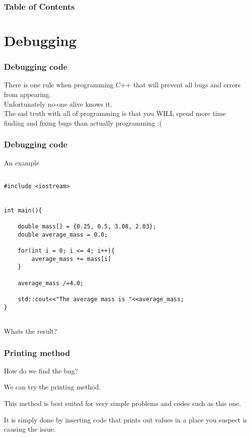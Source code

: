 \documentclass{beamer}
\subtitle{Extra Session}
\begin{document}
	
\frame{\titlepage}
	
\begin{frame}
	\frametitle{Table of Contents}
	\tableofcontents
\end{frame}
\section{Debugging}
\begin{frame}[fragile]
\frametitle{Debugging code}
There is one rule when programming C++ that will prevent all bugs and errors from appearing.\\
\pause
Unfortunately no-one alive knows it.\\
\pause The sad truth with all of programming is that you WILL spend more time finding and fixing bugs than actually programming \pause:(
\end{frame}

\begin{frame}[fragile]
	\frametitle{Debugging code}
	An example
	\pause
	\begin{lstlisting}
		
#include <iostream>
		
		
int main(){
		
	double mass[] = {0.25, 0.5, 3.08, 2.03};
	double average_mass = 0.0;
			
	for(int i = 0; i <= 4; i++){
		average_mass += mass[i]
	}
			
	average_mass /=4.0;
		
	std::cout<<"The average mass is "<<average_mass;
}
		
	\end{lstlisting}
	\pause
	Whats the result?
	
\end{frame}


\begin{frame}[fragile]
	\frametitle{Printing method}
	How do we find the bug?\pause
	
	We can try the printing method.\pause
	
	This method is best suited for very simple problems and codes such as this one.
	\pause
	
	It is simply done by inserting code that prints out values in a place you suspect is causing the issue.

	
\end{frame}
\end{document}
